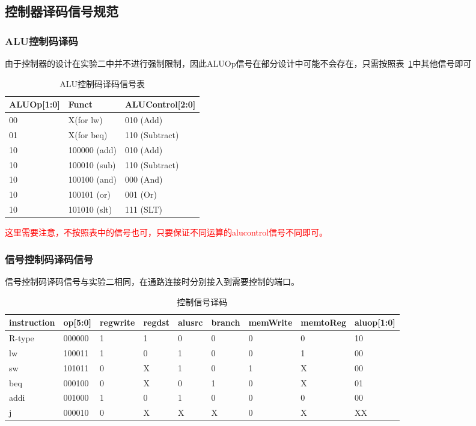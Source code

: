 \subsection{控制器译码信号规范}
\subsubsection{ALU控制码译码}
由于控制器的设计在实验二中并不进行强制限制，因此ALUOp信号在部分设计中可能不会存在，只需按照表~\ref{tab:alu_decoder}中其他信号即可
\begin{table}[htbp]
    \centering
    \begin{tabular}{l|l|l}
        \hline
        ALUOp[1:0]&	Funct&	        ALUControl[2:0]\\ \hline
        00&	        X(for lw)&	            010 (Add) \\
        01&	        X(for beq)&	            110 (Subtract) \\
        10&	        100000 (add)&	010 (Add) \\
        10&	        100010 (sub)&	110 (Subtract)\\
        10&	        100100 (and)&	000 (And) \\
        10&	        100101 (or)&	001 (Or) \\
        10&	        101010 (slt)&	111 (SLT)\\ \hline
 
    \end{tabular}
    \caption{ALU控制码译码信号表}
    \label{tab:alu_decoder}
\end{table}

\textcolor{red}{这里需要注意，不按照表中的信号也可，只要保证不同运算的alucontrol信号不同即可。}
\subsubsection{信号控制码译码信号}
信号控制码译码信号与实验二相同，在通路连接时分别接入到需要控制的端口。
\begin{table}[htbp]
    \centering
    \begin{tabular}{l|l|l|l|l|l|l|l|l}
         instruction&	op[5:0]&	regwrite&	regdst&	alusrc&	branch&	memWrite&	memtoReg&	aluop[1:0]\\ \hline
        R-type&	000000&	1&	1&	0&	0&	0&	0&	10\\
        lw&	100011&	1&	0&	1&	0&	0&	1&	00\\
        sw&	101011&	0&	X&	1&	0&	1&	X&	00\\
        beq&	000100&	0&	X&	0&	1&	0&	X&	01\\
        addi&	001000&	1&	0&	1&	0&	0&	0&	00\\
        j&	000010&	0&	X&	X&	X&	0&	X&	XX \\ \hline
 
    \end{tabular}
    \caption{控制信号译码}
    \label{tab:controller_decode}
\end{table}

